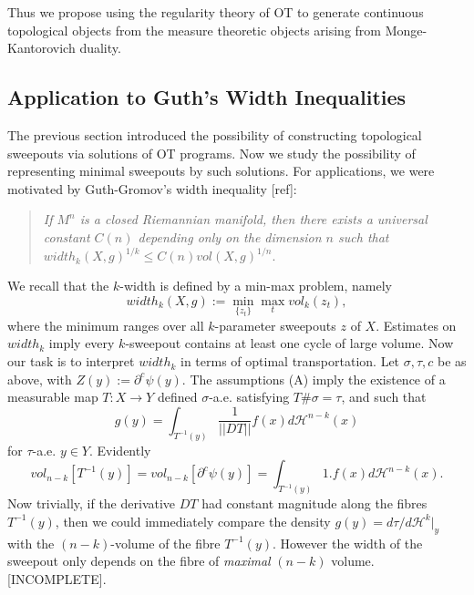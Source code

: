 \documentclass[12pt]{amsart}
\theoremstyle{definition}
\theoremstyle{remark}
\newcommand{\del}{\partial}
\newcommand{\sub}{\del^c \psi(y)}
\begin{document}
Thus we propose using the regularity theory of OT to generate continuous topological objects from the measure theoretic objects arising from Monge-Kantorovich duality. 

\subsection{Application to Guth's Width Inequalities}

The previous section introduced the possibility of constructing topological sweepouts via solutions of OT programs. Now we study the possibility of representing minimal sweepouts by such solutions. For applications, we were motivated by Guth-Gromov's width inequality [ref]: 

\begin{quote} 
\emph{ If $M^n$ is a closed Riemannian manifold, then there exists a universal constant $C(n)$ depending only on the dimension $n$ such that $width_k(X,g)^{1/k}\leq C(n) vol(X,g)^{1/n}.$
} 
\end{quote} 

We recall that the $k$-width is defined by a min-max problem, namely $$width_k(X,g):=\min_{\{z_t\}} \max_{t} vol_k(z_t),$$ where the minimum ranges over all $k$-parameter sweepouts $z$ of $X$. Estimates on $width_k$ imply every $k$-sweepout contains at least one cycle of large volume. Now our task is to interpret $width_k$ in terms of optimal transportation.  Let $\sigma, \tau, c$ be as above, with $Z(y):=\sub$. The assumptions (A) imply the existence of a measurable map $T: X\to Y$ defined $\sigma$-a.e. satisfying $T\# \sigma = \tau$, and such that $$g(y)=\int_{T^{-1}(y)} \frac{1}{||DT||} f(x) d\mathscr{H}^{n-k}(x) $$ for $\tau$-a.e. $y\in Y$. Evidently $$vol_{n-k}[T^{-1}(y)]=vol_{n-k} [\sub]=\int_{T^{-1}(y)} 1 . f(x) d\mathscr{H}^{n-k}(x).$$ Now trivially, if the derivative $DT$ had constant magnitude along the fibres $T^{-1}(y)$, then we could immediately compare the density $g(y)=d\tau/d\mathscr{H}^{k}|_y$ with the $(n-k)$-volume of the fibre $T^{-1}(y)$. However the width of the sweepout only depends on the fibre of \emph{maximal} $(n-k)$ volume. [INCOMPLETE].









\end{document}
